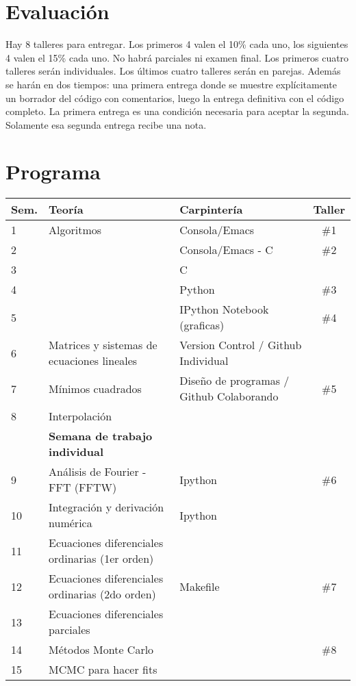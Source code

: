 \documentclass[12pt]{article}
\begin{document}
\section*{Evaluaci\'on}

Hay 8 talleres para entregar. Los primeros 4 valen el 10\% cada uno, los siguientes 4 valen el 15\% cada uno. No habr\'a parciales ni examen final. Los primeros cuatro talleres ser\'an individuales. Los \'ultimos cuatro talleres ser\'an en parejas. Adem\'as se har\'an en dos tiempos: una primera entrega donde se muestre expl\'icitamente un borrador del c\'odigo con comentarios, luego la entrega definitiva con el c\'odigo completo. La primera entrega es una condici\'on necesaria para aceptar la segunda. Solamente esa segunda entrega recibe una nota.

 
\section*{Programa}

\begin{center}
\begin{tabular}{|p{1cm}|p{6cm}|p{5cm}|c|}
\hline
Sem. & Teor\'ia & Carpinter\'ia & Taller \\\hline
1 & Algoritmos	&Consola/Emacs & \#1\\
2 & 	& Consola/Emacs - C  & \#2\\
3 & 	&C  &    \\
4 & 	&Python & \#3\\
5 & 	&IPython Notebook (graficas) & \#4 \\
6 & Matrices y sistemas de ecuaciones lineales  & Version Control / Github Individual &\\
7 & M\'inimos cuadrados & Dise\~no de programas / Github Colaborando & \#5\\
8 & Interpolaci\'on & & \\
 & {\bf Semana de trabajo individual} & &\\
9 & An\'alisis de Fourier - FFT  (FFTW)&  Ipython & \#6 \\
10 & Integraci\'on y derivaci\'on num\'erica & Ipython &\\
11 & Ecuaciones diferenciales ordinarias (1er orden)&  &\\
12 & Ecuaciones diferenciales ordinarias (2do orden)&  Makefile & \#7 \\
13 & Ecuaciones diferenciales parciales &  & \\
14 & M\'etodos Monte Carlo &   & \#8 \\
15 & MCMC para hacer fits &    & \\

\hline
\end{tabular}
\end{center}
\end{document}
